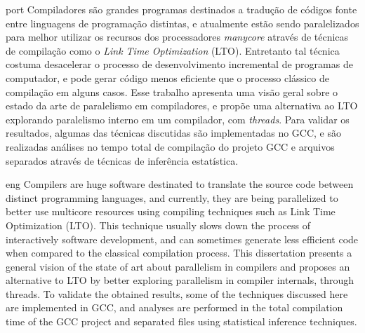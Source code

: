 \begin{resumo}{port}
    Compiladores são grandes programas destinados a tradução de códigos fonte
    entre linguagens de programação distintas, e atualmente estão sendo
    paralelizados para melhor utilizar os recursos dos processadores
    \textit{manycore} através de técnicas de compilação como o \textit{Link
    Time Optimization} (LTO).  Entretanto tal técnica costuma desacelerar o
    processo de desenvolvimento incremental de programas de computador, e pode
    gerar código menos eficiente que o processo clássico de compilação em
    alguns casos. Esse trabalho apresenta uma visão geral sobre o estado da
    arte de paralelismo em compiladores, e propõe uma alternativa ao LTO explorando
    paralelismo interno em um compilador, com \textit{threads}. Para validar
    os resultados, algumas das técnicas discutidas são implementadas no GCC, e
    são realizadas análises no tempo total de compilação do projeto GCC e
    arquivos separados através de técnicas de inferência estatística.
\end{resumo}


\begin{resumo}{eng}
Compilers are huge software destinated to translate the source code between
distinct programming languages, and currently, they are being parallelized to
better use multicore resources using compiling techniques such as Link Time
Optimization (LTO). This technique usually slows down the process of
interactively software development, and can sometimes generate less efficient
code when compared to the classical compilation process. This dissertation presents a
general vision of the state of art about parallelism in compilers and proposes
an alternative to LTO by better exploring parallelism in compiler internals,
through threads. To
validate the obtained results, some of the techniques discussed here are
implemented in GCC, and analyses are performed in the total compilation time of
the GCC project and separated files using statistical inference techniques.
\end{resumo}
